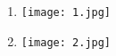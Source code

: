 \begin{question}
  
   \begin{enumerate}[label=\alph*)]
   
   		\item 
    \begin{minipage}[H]{\linewidth}                       
			\texttt{[image: 1.jpg]}   		
    \end{minipage}
    
   		\item 
     \begin{minipage}[H]{\linewidth}                       
			\texttt{[image: 2.jpg]}   		
    \end{minipage}
   \end{enumerate}
\end{question}

\newpage